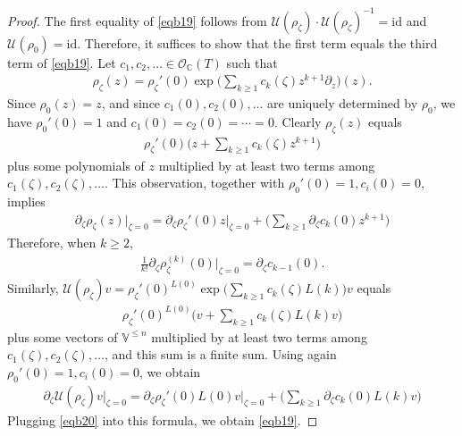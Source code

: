 \documentclass[11pt,b5paper,notitlepage]{article}
\theoremstyle{definition}
\theoremstyle{plain}
\newcommand{\mc}{\mathcal}
\newcommand{\scr}{\mathscr}
\newcommand{\Vbb}{\mathbb V}
\newcommand{\Cbb}{\mathbb C}
\newcommand{\<}{\left\langle}
\renewcommand{\>}{\right\rangle}
\newcommand{\id}{\mathrm{id}}
\numberwithin{equation}{subsection}
\begin{document}
\begin{proof}
The first equality of \eqref{eqb19} follows from $\mc U(\rho_\zeta)\cdot\mc U(\rho_\zeta)^{-1}=\id$ and $\mc U(\rho_0)=\id$. Therefore, it suffices to show that the first term equals the third term of \eqref{eqb19}. Let $c_1,c_2,\dots\in\scr O_{\Cbb}(T)$ such that 
\begin{gather*}
\rho_\zeta(z)=\rho_\zeta'(0)\exp\Big(\sum_{k\geq 1}c_k(\zeta)z^{k+1}\partial_z\Big)(z).
\end{gather*}
Since $\rho_0(z)=z$, and since $c_1(0),c_2(0),\dots$ are uniquely determined by $\rho_0$, we have $\rho_0'(0)=1$ and $c_1(0)=c_2(0)=\cdots=0$. Clearly $\rho_\zeta(z)$ equals
\begin{align*}
\rho_\zeta'(0)\Big(z+\sum_{k\geq 1}c_k(\zeta)z^{k+1}\Big)
\end{align*}
plus some polynomials of $z$ multiplied by at least two terms among $c_1(\zeta),c_2(\zeta),\dots$. This observation, together with $\rho_0'(0)=1,c_i(0)=0$, implies
\begin{align*}
\partial_\zeta\rho_\zeta(z)\Big|_{\zeta=0}=\partial_\zeta\rho_\zeta'(0)z\Big|_{\zeta=0}+\Big(\sum_{k\geq 1}\partial_\zeta c_k(0)z^{k+1}\Big)
\end{align*}
Therefore, when $k\geq 2$,
\begin{align*}
\frac 1{k!}\partial_\zeta\rho_\zeta^{(k)}(0)\Big|_{\zeta=0}=\partial_\zeta c_{k-1}(0). \tag{$\star$} \label{eqb20}
\end{align*}
Similarly, $\mc U(\rho_\zeta)v=\rho_\zeta'(0)^{L(0)}\exp\big(\sum_{k\geq1}c_k(\zeta)L(k)\big)v$ equals
\begin{align*}
\rho_\zeta'(0)^{L(0)}\Big( v+\sum_{k\geq1}c_k(\zeta)L(k)v\Big)
\end{align*}
plus some vectors of $\Vbb^{\leq n}$ multiplied by at least two terms among $c_1(\zeta),c_2(\zeta),\dots$, and this sum is a finite sum. Using again $\rho_0'(0)=1,c_i(0)=0$, we obtain
\begin{align*}
\partial_\zeta\mc U(\rho_\zeta)v|_{\zeta=0}=\partial_\zeta\rho_\zeta'(0) L(0)v\Big|_{\zeta=0}+\Big(\sum_{k\geq 1}\partial_\zeta c_k(0) L(k)v\Big)
\end{align*}
Plugging \eqref{eqb20} into this formula, we obtain \eqref{eqb19}.
\end{proof}
\end{document}
